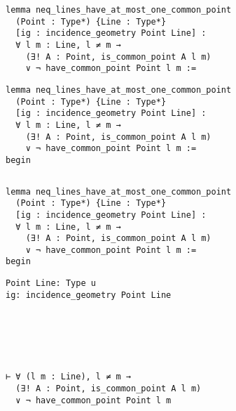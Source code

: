 \begin{frame}[fragile]
	\begin{multicols}{2}
		\begin{lstlisting}
lemma neq_lines_have_at_most_one_common_point 
  (Point : Type*) {Line : Type*} 
  [ig : incidence_geometry Point Line] :
  ∀ l m : Line, l ≠ m → 
    (∃! A : Point, is_common_point A l m) 
    ∨ ¬ have_common_point Point l m := 
\end{lstlisting}
		\columnbreak
		\hfill
	\end{multicols}
\end{frame}










\begin{frame}[fragile]
	\begin{multicols}{2}
		\begin{lstlisting}
lemma neq_lines_have_at_most_one_common_point 
  (Point : Type*) {Line : Type*} 
  [ig : incidence_geometry Point Line] :
  ∀ l m : Line, l ≠ m → 
    (∃! A : Point, is_common_point A l m) 
    ∨ ¬ have_common_point Point l m := 
begin
\end{lstlisting}
		\columnbreak
		\begin{lstlisting}

		\end{lstlisting}
	\end{multicols}
\end{frame}










\begin{frame}[fragile]
	\begin{multicols}{2}
		\begin{lstlisting}
lemma neq_lines_have_at_most_one_common_point 
  (Point : Type*) {Line : Type*} 
  [ig : incidence_geometry Point Line] :
  ∀ l m : Line, l ≠ m → 
    (∃! A : Point, is_common_point A l m) 
    ∨ ¬ have_common_point Point l m := 
begin
\end{lstlisting}
		\columnbreak
		\begin{lstlisting}
Point Line: Type u
ig: incidence_geometry Point Line






⊢ ∀ (l m : Line), l ≠ m → 
  (∃! A : Point, is_common_point A l m) 
  ∨ ¬ have_common_point Point l m
		\end{lstlisting}
	\end{multicols}
\end{frame}










